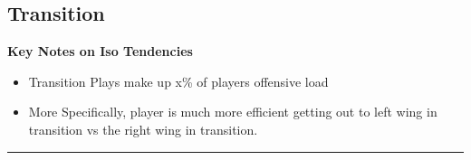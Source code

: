 \documentclass[a4paper,12pt]{article}
\begin{document}
\vspace{0em} %
\vspace{-1em} %

\clearpage





\subsection{Transition}
\vspace{0.25em} %
\textbf{Key Notes on Iso Tendencies}
\vspace{0.5em} %

\begin{itemize}
    \item Transition Plays make up x\% of players offensive load
    \vspace{0.3em} %
    \item More Specifically, player is much more efficient getting out to left wing in transition vs the right wing in transition. 
\end{itemize}

\vspace{1em} %
\hrule height 1pt width 1\textwidth %
\vspace{0em} %
\end{document}
